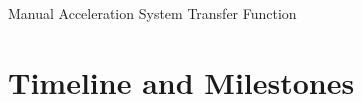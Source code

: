 \documentclass{beamer}
\begin{document}
\begin{frame}{Manual Acceleration System Transfer Function}
\end{frame}


\section{Timeline and Milestones}
\end{document}
